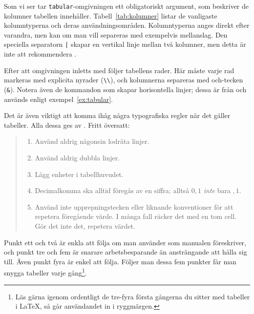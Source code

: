 \documentclass[../../latex.tex]{subfiles}
\begin{document}
Som vi ser tar \texttt{tabular}-omgivningen ett obligatoriskt argument,
som beskriver de kolumner tabellen innehåller. Tabell~\vref{tab:kolumner}
listar de vanligaste kolumntyperna och deras användningsområden.
Kolumntyperna anges direkt efter varandra, men kan om man vill separeras
med exempelvis mellanslag. Den speciella separatorn \texttt{|} skapar en
vertikal linje mellan två kolumner, men detta är inte att rekommendera
\cite{Fear05}.

Efter att omgivningen inletts med  följer tabellens rader. Här
måste varje rad markeras med explicita nyrader (\verb|\\|), och kolumnerna
separeras med och-tecken (\verb|&|). Notera även de kommandon som skapar
horisontella linjer; dessa är från  och används enligt
exempel~\ref{ex:tabular}.

\newpage
Det är även viktigt att komma ihåg några typografiska regler när det
gäller tabeller. Alla dessa ges av . Fritt
översatt:

\begin{quotation}
	\begin{enumerate}
		\item Använd aldrig någonsin lodräta linjer.
		\item Använd aldrig dubbla linjer.
		\item Lägg enheter i tabellhuvudet.
		\item Decimalkomma ska alltid föregås av en siffra; alltså \(0,1\) 
		\emph{inte} bara \(,1\).
		\item Använd inte upprepningstecken eller liknande konventioner 
		för att repetera föregående värde. I många fall räcker det med en 
		tom cell. Gör det inte det, repetera värdet.
	\end{enumerate}
\end{quotation}

Punkt ett och två är enkla att följa om man använder  som
manualen föreskriver, och punkt tre och fem är snarare arbetsbesparande än
ansträngande att hålla sig till. Även punkt fyra är enkel att följa. 
Följer man
dessa fem punkter får man snygga tabeller varje gång\footnote{Läs gärna
igenom  ordentligt de tre-fyra första gångerna du
sitter med tabeller i \LaTeX, så går användandet in i ryggmärgen.}.
\end{document}
